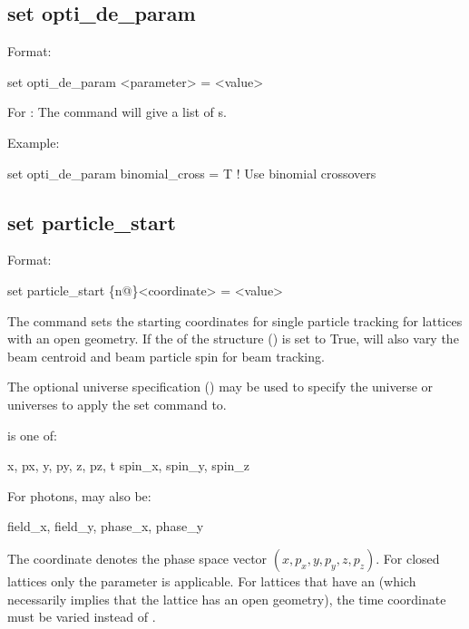 {{%

\subsection{set opti_de_param}
\label{s:set.opti.de.param}

Format:
\begin{example}
  set opti_de_param <parameter> = <value>
\end{example}

For : The  command will give a list of s.

Example:
\begin{example}
  set opti_de_param binomial_cross = T  ! Use binomial crossovers 
\end{example}


\subsection{set particle_start}
\label{s:set.particle.start}

Format:
\begin{example}
  set particle_start \{n@\}<coordinate> = <value>
\end{example}
The  command sets the starting coordinates for single particle tracking for
lattices with an open geometry. If the  of the 
structure () is set to True,  will also vary the beam centroid
and beam particle spin for beam tracking.

The optional  universe specification () may be used to specify the universe
or universes to apply the set command to.

 is one of:
\begin{example}
  x, px, y, py, z, pz, t
  spin_x, spin_y, spin_z
\end{example}
For photons,  may also be:
\begin{example}
  field_x, field_y, phase_x, phase_y
\end{example}
The \vn{*} coordinate denotes the phase space vector $(x, p_x, y, p_y, z, p_z)$.  For closed
lattices only the  parameter is applicable. For lattices that have an  (which
necessarily implies that the lattice has an open geometry), the time  coordinate must be
varied instead of .

}}
